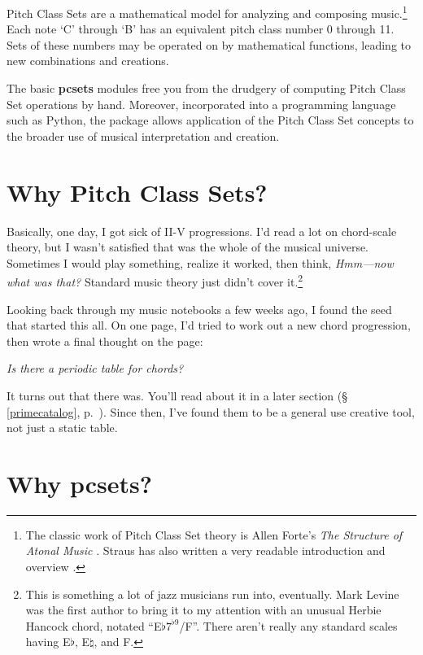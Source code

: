 \documentclass[letterpaper,12pt,oneside]{book}
\begin{document}
Pitch Class Sets are a mathematical model for analyzing and composing
music.\footnote{ The classic work of Pitch Class Set theory is Allen
Forte's {\em The Structure of Atonal Music} \cite{forte}. Straus has
also written a very readable introduction and overview \cite{straus}.
} Each note `C' through `B' has an equivalent pitch class number 0
through 11. Sets of these numbers may be operated on by mathematical
functions, leading to new combinations and creations.

The basic {\bf pcsets} modules free you from the drudgery of computing
Pitch Class Set operations by hand. Moreover, incorporated into a
programming language such as Python, the package allows application
of the Pitch Class Set concepts to the broader use of musical
interpretation and creation.


\section{Why Pitch Class Sets?}

Basically, one day, I got sick of II-V progressions. I'd read a lot on
chord-scale theory, but I wasn't satisfied that was the whole of the
musical universe. Sometimes I would play something, realize it worked,
then think, {\em Hmm---now what was that?} Standard music theory just
didn't cover it.\footnote{ This is something a lot of jazz musicians
run into, eventually. Mark Levine was the first author to bring it to
my attention \citep[p.~250]{levinep} with an unusual Herbie Hancock
chord, notated ``E$\flat{}7^{\flat{}9}$/F''. There aren't really any
standard scales having E$\flat$, E$\natural$, and F. }

Looking back through my music notebooks a few weeks ago, I found the
seed that started this all. On one page, I'd tried to work out a new
chord progression, then wrote a final thought on the page:

\begin{center}
{\em Is there a periodic table for chords?}
\end{center}

It turns out that there was. You'll read about it in a later section
(\S{} \ref{primecatalog}, p.~\pageref{primecatalog}). Since then, I've
found them to be a general use creative tool, not just a static table.


\section{Why pcsets?}
\end{document}
